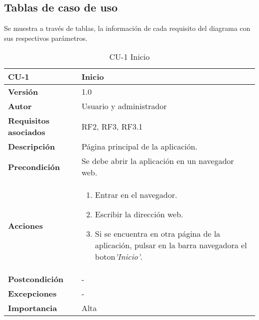 \subsection{Tablas de caso de uso}
Se muestra a través de tablas, la información de cada requisito del diagrama con sus respectivos parámetros.
\begin{table}[h!]
	\centering
	\begin{tabularx}{\linewidth}{ p{} p{} }
		\toprule
		\textbf{CU-1}    & \textbf{Inicio}\\
		\toprule
		\textbf{Versión}              & 1.0    \\
		\textbf{Autor}                & Usuario y administrador \\
		\textbf{Requisitos asociados} & RF2, RF3, RF3.1 \\
		\textbf{Descripción}          & Página principal de la aplicación. \\
		\textbf{Precondición}         & Se debe abrir la aplicación en un navegador web. \\
		\textbf{Acciones}             &
		\begin{enumerate}
			\def\labelenumi{\arabic{enumi}.}
			\tightlist
			\item Entrar en el navegador.
			\item Escribir la dirección web.
                \item Si se encuentra en otra página de la aplicación, pulsar en la barra navegadora el boton\textit{'Inicio'}.
		\end{enumerate}\\
		\textbf{Postcondición}        &  -\\
		\textbf{Excepciones}          &  -\\
		\textbf{Importancia}          & Alta \\
		\bottomrule
	\end{tabularx}
	\caption{CU-1 Inicio}
\end{table}
